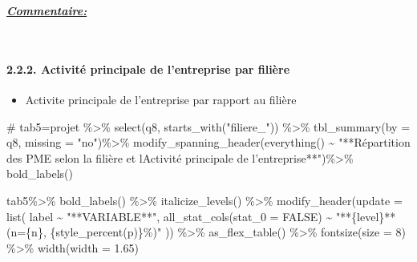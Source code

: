 \documentclass[
  letterpaper,
  DIV=11,
  numbers=noendperiod]{scrartcl}
\let\oldparagraph\paragraph
\renewcommand{\paragraph}[1]{\oldparagraph{#1}\mbox{}}
\newenvironment{Shaded}{\begin{snugshade}}{\end{snugshade}}
\newcommand{\AttributeTok}[1]{\textcolor[rgb]{0.40,0.45,0.13}{#1}}
\newcommand{\CommentTok}[1]{\textcolor[rgb]{0.37,0.37,0.37}{#1}}
\newcommand{\ConstantTok}[1]{\textcolor[rgb]{0.56,0.35,0.01}{#1}}
\newcommand{\DecValTok}[1]{\textcolor[rgb]{0.68,0.00,0.00}{#1}}
\newcommand{\FloatTok}[1]{\textcolor[rgb]{0.68,0.00,0.00}{#1}}
\newcommand{\FunctionTok}[1]{\textcolor[rgb]{0.28,0.35,0.67}{#1}}
\newcommand{\NormalTok}[1]{\textcolor[rgb]{0.00,0.23,0.31}{#1}}
\newcommand{\OtherTok}[1]{\textcolor[rgb]{0.00,0.23,0.31}{#1}}
\newcommand{\SpecialCharTok}[1]{\textcolor[rgb]{0.37,0.37,0.37}{#1}}
\newcommand{\StringTok}[1]{\textcolor[rgb]{0.13,0.47,0.30}{#1}}
\providecommand{\tightlist}{%
  \setlength{\itemsep}{0pt}\setlength{\parskip}{0pt}}\usepackage{longtable,booktabs,array}
\begin{document}
\ul{\textbf{\emph{Commentaire:}}}\\
\strut \\

\hypertarget{activituxe9-principale-de-lentreprise-par-filiuxe8re}{%
\paragraph{2.2.2. Activité principale de l'entreprise par
filière}\label{activituxe9-principale-de-lentreprise-par-filiuxe8re}}

\begin{itemize}
\tightlist
\item
  Activite principale de l'entreprise par rapport au filière
\end{itemize}

\begin{Shaded}
\begin{Highlighting}[]
\CommentTok{\#}
\NormalTok{tab5}\OtherTok{=}\NormalTok{projet }\SpecialCharTok{\%\textgreater{}\%}
    \FunctionTok{select}\NormalTok{(q8, }\FunctionTok{starts\_with}\NormalTok{(}\StringTok{"filiere\_"}\NormalTok{)) }\SpecialCharTok{\%\textgreater{}\%}
      \FunctionTok{tbl\_summary}\NormalTok{(}\AttributeTok{by =}\NormalTok{ q8, }\AttributeTok{missing =} \StringTok{"no"}\NormalTok{)}\SpecialCharTok{\%\textgreater{}\%}
        \FunctionTok{modify\_spanning\_header}\NormalTok{(}\FunctionTok{everything}\NormalTok{() }\SpecialCharTok{\textasciitilde{}} \StringTok{"**Répartition des PME selon la filière et l\textquotesingle{}Activité principale de l’entreprise**"}\NormalTok{)}\SpecialCharTok{\%\textgreater{}\%} 
            \FunctionTok{bold\_labels}\NormalTok{()}



\NormalTok{tab5}\SpecialCharTok{\%\textgreater{}\%} \FunctionTok{bold\_labels}\NormalTok{() }\SpecialCharTok{\%\textgreater{}\%} 
  \FunctionTok{italicize\_levels}\NormalTok{()  }\SpecialCharTok{\%\textgreater{}\%} 
  \FunctionTok{modify\_header}\NormalTok{(}\AttributeTok{update =} \FunctionTok{list}\NormalTok{( label }\SpecialCharTok{\textasciitilde{}} \StringTok{"**VARIABLE**"}\NormalTok{, }\FunctionTok{all\_stat\_cols}\NormalTok{(}\AttributeTok{stat\_0 =} \ConstantTok{FALSE}\NormalTok{) }\SpecialCharTok{\textasciitilde{}} \StringTok{"**\{level\}** (n=\{n\}, \{style\_percent(p)\}\%)"}
\NormalTok{  )) }\SpecialCharTok{\%\textgreater{}\%}  \FunctionTok{as\_flex\_table}\NormalTok{() }\SpecialCharTok{\%\textgreater{}\%}
  \FunctionTok{fontsize}\NormalTok{(}\AttributeTok{size =} \DecValTok{8}\NormalTok{) }\SpecialCharTok{\%\textgreater{}\%}
  \FunctionTok{width}\NormalTok{(}\AttributeTok{width =} \FloatTok{1.65}\NormalTok{)}
\end{Highlighting}
\end{Shaded}
\end{document}

